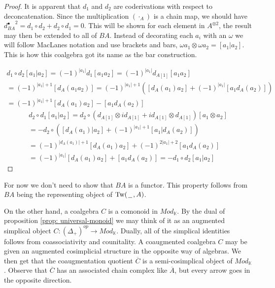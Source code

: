 \documentclass[../thesis.tex]{subfiles}
\begin{document}
            \begin{proof}
                    It is apparent that $d_1$ and $d_2$ are coderivations with respect to deconcatenation. Since the multiplication $(\cdot_A)$ is a chain map, we should have ${d_{BA}^\bullet}^2 = d_1 \circ d_2 + d_2 \circ d_1= 0$. This will be shown for each element in $A^{\otimes 2}$, the result may then be extended to all of $BA$. Instead of decorating each $a_i$ with an $\omega$ we will follow MacLanes notation and use brackets and bars, $\omega a_1 \otimes \omega a_2 = [a_1 | a_2]$. This is how this coalgebra got its name as the bar construction.

                \begin{multline*}
                    d_1 \circ d_2 [a_1 | a_2] = (-1)^{|a_1|}d_1 [a_1a_2] = (-1)^{|a_1|}d_{A[1]}[a_1a_2] \\ = (-1)^{|a_1|+1}[d_A(a_1a_2)] = (-1)^{|a_1|+1}([d_A(a_1)a_2] + (-1)^{|a_1|}[a_1d_A(a_2)]) \\ = (-1)^{|a_1|+1}[d_A(a_1)a_2] - [a_1d_A(a_2)]
                \end{multline*}
                \begin{multline*}
                    d_2\circ d_1 [a_1 | a_2] = d_2\circ (d_{A[1]}\otimes id_{A[1]} + id_{A[1]}\otimes d_{A[1]}) [a_1\otimes a_2] \\ = -d_2 \circ ([d_A(a_1) | a_2] + (-1)^{|a_1|+1}[a_1 | d_A(a_2)]) \\ = (-1)^{|d_A(a_1)|+1}[d_A(a_1)a_2] + (-1)^{2|a_1|+2}[a_1d_A(a_2)] \\ = (-1)^{|a_1|}[d_A(a_1)a_2] + [a_1d_A(a_2)] = -d_1\circ d_2 [a_1 | a_2]
                \end{multline*}
            \end{proof}

            \begin{remark}
                For now we don't need to show that $BA$ is a functor. This property follows from $BA$ being the representing object of $\text{Tw}(\hspace{0.05cm}\underline{\hspace{0.2cm}}\hspace{0.05cm},A)$.
            \end{remark}

            On the other hand, a coalgebra $C$ is a comonoid in $Mod_\mathbb{K}$. By the dual of proposition \ref{prop: universal-monoid} we may think of it as an augmented simplical object $C:(\Delta_+)^{op} \rightarrow Mod_\mathbb{K}$. Dually, all of the simplical identities follows from coassociativity and counitality. A coaugmented coalgebra $C$ may be given an augmented cosimplicial structure in the opposite way of algebras. We then get that the coaugmentation quotient $\overline{C}$ is a semi-cosimplical object of $Mod_\mathbb{K}$. Observe that $\overline{C}$ has an associated chain complex like $\overline{A}$, but every arrow goes in the opposite direction.
\end{document}
